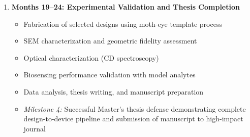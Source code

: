 \documentclass[12pt,a4paper]{article}
\begin{document}
\begin{enumerate}
  \item \textbf{Months 19--24: Experimental Validation and Thesis Completion}
  \begin{itemize}
    \item Fabrication of selected designs using moth-eye template process
    \item SEM characterization and geometric fidelity assessment
    \item Optical characterization (CD spectroscopy)
    \item Biosensing performance validation with model analytes
    \item Data analysis, thesis writing, and manuscript preparation
    \item \textit{Milestone 4:} Successful Master's thesis defense demonstrating complete design-to-device pipeline and submission of manuscript to high-impact journal
  \end{itemize}
\end{enumerate}

\newpage
\printbibliography[title={References}]
\end{document}

